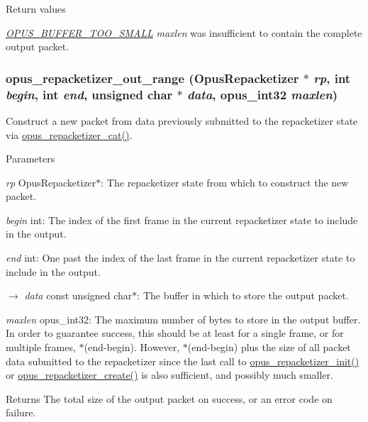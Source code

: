 \begin{DoxyRetVals}{Return values}
\item[{\em \hyperlink{group__opus__errorcodes_gacd897c05563ec04a67d8e92ba29f3d4f}{OPUS\_\-BUFFER\_\-TOO\_\-SMALL}}]{\itshape maxlen\/} was insufficient to contain the complete output packet. \end{DoxyRetVals}
\hypertarget{group__opus__repacketizer_gac591b550d92125b4abfa11a4b609f51f}{
\subsubsection[{opus\_\-repacketizer\_\-out\_\-range}]{ opus\_\-repacketizer\_\-out\_\-range ({\bf OpusRepacketizer} $\ast$ {\em rp}, \/  int {\em begin}, \/  int {\em end}, \/  unsigned char $\ast$ {\em data}, \/  {\bf opus\_\-int32} {\em maxlen})}}
\label{group__opus__repacketizer_gac591b550d92125b4abfa11a4b609f51f}


Construct a new packet from data previously submitted to the repacketizer state via \hyperlink{group__opus__repacketizer_ga2840dd56bfa37f8c6874355b9ce8fb46}{opus\_\-repacketizer\_\-cat()}. 
\begin{DoxyParams}{Parameters}
\item[{\em rp}]{\ttfamily OpusRepacketizer$\ast$}: The repacketizer state from which to construct the new packet. \item[{\em begin}]{\ttfamily int}: The index of the first frame in the current repacketizer state to include in the output. \item[{\em end}]{\ttfamily int}: One past the index of the last frame in the current repacketizer state to include in the output. \item[\mbox{$\rightarrow$} {\em data}]{\ttfamily const unsigned char$\ast$}: The buffer in which to store the output packet. \item[{\em maxlen}]{\ttfamily opus\_\-int32}: The maximum number of bytes to store in the output buffer. In order to guarantee success, this should be at least {} for a single frame, or for multiple frames, {$\ast$(end-\/begin)}. However, {$\ast$(end-\/begin)} plus the size of all packet data submitted to the repacketizer since the last call to \hyperlink{group__opus__repacketizer_gab42ff7c3f8a49ff5029fcf60f3b853f0}{opus\_\-repacketizer\_\-init()} or \hyperlink{group__opus__repacketizer_ga6f8813666ef851550ecf8658a731ff7d}{opus\_\-repacketizer\_\-create()} is also sufficient, and possibly much smaller. \end{DoxyParams}
\begin{DoxyReturn}{Returns}
The total size of the output packet on success, or an error code on failure. 
\end{DoxyReturn}


